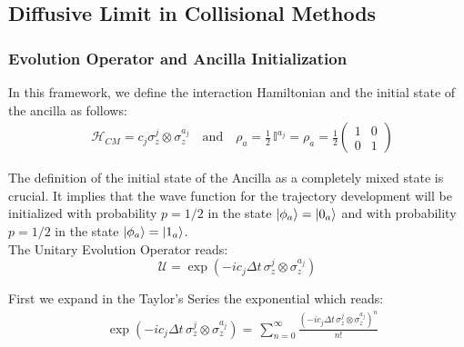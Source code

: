 \documentclass[a4paper,12pt]{article}
\begin{document}
	\clearpage
	\newpage
		
	\subsection{Diffusive Limit in Collisional Methods}

	\subsubsection{Evolution Operator and Ancilla Initialization}
	
	In this framework, we define the interaction Hamiltonian and the initial state of the ancilla as follows:
	\begin{align} 
		&\mathcal{H}_{CM} = c_{j} \sigma_{z}^{j} \otimes \sigma_{z}^{a_j} \quad \text{and} \quad \rho_{a} = \frac{1}{2} \, \mathbb{I}^{a_j} =\rho_{a} = \frac{1}{2} \begin{pmatrix} 1 & 0 \\ 0 & 1 \end{pmatrix} 
	\end{align}
	
	The definition of the initial state of the Ancilla as a completely mixed state is crucial. It implies that the wave function for the trajectory development will be initialized with probability $p=1/2$ in the state $ \ket{\phi_a} = \ket{0_a} $ and with probability $p=1/2$ in the state $ \ket{\phi_a} = \ket{1_a} $. \\
	
	The Unitary Evolution Operator reads: 
	\begin{equation}
		\mathcal{U} = \exp{\left( -i c_j \Delta t \, \sigma_{z}^{j} \otimes \sigma_{z}^{a_j} \right)}
	\end{equation}
	
	First we expand in the Taylor's Series the exponential which reads:
	\begin{equation}
	\begin{aligned}
		&\exp{\left( -i c_j \Delta t \, \sigma_{z}^{j} \otimes \sigma_{z}^{a_j} \right)} = \, \sum_{n=0}^{\infty}{\frac{\left( -i c_j \Delta t \, \sigma_{z}^{j} \otimes \sigma_{z}^{a_j} \right)^n}{n!} } \\
	\end{aligned}
	\end{equation}
		
\end{document}
